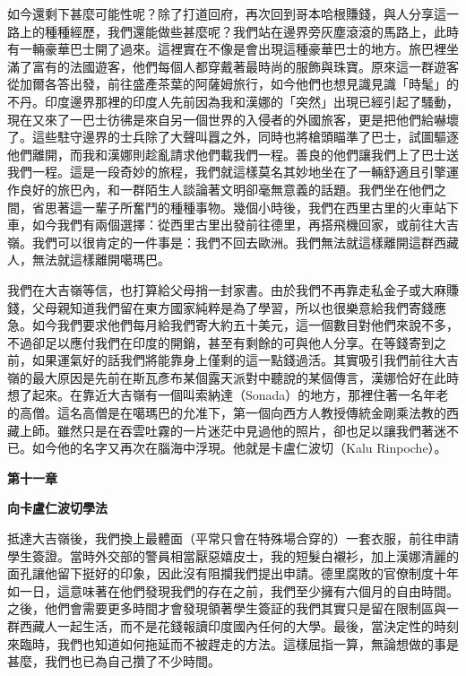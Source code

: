 如今還剩下甚麼可能性呢？除了打道回府，再次回到哥本哈根賺錢，與人分享這一路上的種種經歷，我們還能做些甚麼呢？我們站在邊界旁灰塵滾滾的馬路上，此時有一輛豪華巴士開了過來。這裡實在不像是會出現這種豪華巴士的地方。旅巴裡坐滿了富有的法國遊客，他們每個人都穿戴著最時尚的服飾與珠寶。原來這一群遊客從加爾各答出發，前往盛產茶葉的阿薩姆旅行，如今他們也想見識見識「時髦」的不丹。印度邊界那裡的印度人先前因為我和漢娜的「突然」出現已經引起了騷動，現在又來了一巴士彷彿是來自另一個世界的入侵者的外國旅客，更是把他們給嚇壞了。這些駐守邊界的士兵除了大聲叫囂之外，同時也將槍頭瞄準了巴士，試圖驅逐他們離開，而我和漢娜則趁亂請求他們載我們一程。善良的他們讓我們上了巴士送我們一程。這是一段奇妙的旅程，我們就這樣莫名其妙地坐在了一輛舒適且引擎運作良好的旅巴內，和一群陌生人談論著文明卻毫無意義的話題。我們坐在他們之間，省思著這一輩子所奮鬥的種種事物。幾個小時後，我們在西里古里的火車站下車，如今我們有兩個選擇：從西里古里出發前往德里，再搭飛機回家，或前往大吉嶺。我們可以很肯定的一件事是：我們不回去歐洲。我們無法就這樣離開這群西藏人，無法就這樣離開噶瑪巴。

我們在大吉嶺等信，也打算給父母捎一封家書。由於我們不再靠走私金子或大麻賺錢，父母親知道我們留在東方國家純粹是為了學習，所以也很樂意給我們寄錢應急。如今我們要求他們每月給我們寄大約五十美元，這一個數目對他們來說不多，不過卻足以應付我們在印度的開銷，甚至有剩餘的可與他人分享。在等錢寄到之前，如果運氣好的話我們將能靠身上僅剩的這一點錢過活。其實吸引我們前往大吉嶺的最大原因是先前在斯瓦彥布某個露天派對中聽說的某個傳言，漢娜恰好在此時想了起來。在靠近大吉嶺有一個叫索納達（Sonada）的地方，那裡住著一名年老的高僧。這名高僧是在噶瑪巴的允准下，第一個向西方人教授傳統金剛乘法教的西藏上師。雖然只是在吞雲吐霧的一片迷茫中見過他的照片，卻也足以讓我們著迷不已。如今他的名字又再次在腦海中浮現。他就是卡盧仁波切（Kalu
Rinpoche）。

\textbf{第十一章}

\textbf{向卡盧仁波切學法}

抵達大吉嶺後，我們換上最體面（平常只會在特殊場合穿的）一套衣服，前往申請學生簽證。當時外交部的警員相當厭惡嬉皮士，我的短髮白襯衫，加上漢娜清麗的面孔讓他留下挺好的印象，因此沒有阻攔我們提出申請。德里腐敗的官僚制度十年如一日，這意味著在他們發現我們的存在之前，我們至少擁有六個月的自由時間。之後，他們會需要更多時間才會發現領著學生簽証的我們其實只是留在限制區與一群西藏人一起生活，而不是花錢報讀印度國內任何的大學。最後，當決定性的時刻來臨時，我們也知道如何拖延而不被趕走的方法。這樣屈指一算，無論想做的事是甚麼，我們也已為自己攢了不少時間。

